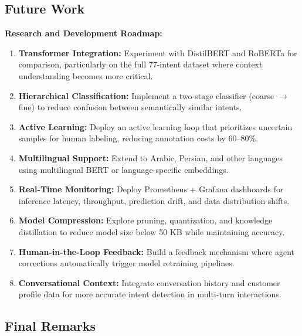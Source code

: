 \documentclass[12pt,a4paper]{article}
\begin{document}
\subsection{Future Work}
\label{subsec:future}

\begin{insightbox}
\textbf{Research and Development Roadmap:}
\begin{enumerate}[leftmargin=*]
    \item \textbf{Transformer Integration:} Experiment with DistilBERT and RoBERTa for comparison, particularly on the full 77-intent dataset where context understanding becomes more critical.

    \item \textbf{Hierarchical Classification:} Implement a two-stage classifier (coarse $\rightarrow$ fine) to reduce confusion between semantically similar intents.

    \item \textbf{Active Learning:} Deploy an active learning loop that prioritizes uncertain samples for human labeling, reducing annotation costs by 60--80\%.

    \item \textbf{Multilingual Support:} Extend to Arabic, Persian, and other languages using multilingual BERT or language-specific embeddings.

    \item \textbf{Real-Time Monitoring:} Deploy Prometheus + Grafana dashboards for inference latency, throughput, prediction drift, and data distribution shifts.

    \item \textbf{Model Compression:} Explore pruning, quantization, and knowledge distillation to reduce model size below 50 KB while maintaining accuracy.

    \item \textbf{Human-in-the-Loop Feedback:} Build a feedback mechanism where agent corrections automatically trigger model retraining pipelines.

    \item \textbf{Conversational Context:} Integrate conversation history and customer profile data for more accurate intent detection in multi-turn interactions.
\end{enumerate}
\end{insightbox}

\subsection{Final Remarks}
\label{subsec:final}
\end{document}
